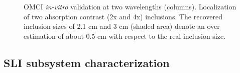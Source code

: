 \begin{figure}[]
    \begin{center}
    \end{center}
    \caption{OMCI \textit{in-vitro} validation at two wavelengths (columns). Localization of two absorption contrast (2x and 4x) inclusions. The recovered inclusion sizes of 2.1 cm and 3 cm (shaded area) denote an over estimation of about 0.5 cm with respect to the real inclusion size.} 
    \label{fig:PhantomResults}
\end{figure} 



\subsection{SLI subsystem characterization}


